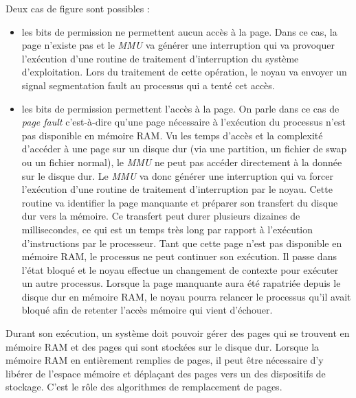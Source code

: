 \begin{itemize}
        Deux cas de figure sont possibles :
        \begin{itemize}
            \item les bits de permission ne permettent aucun accès à la
                page. Dans ce cas, la page n'existe pas et le
                \textit{MMU} va générer une interruption qui va
                provoquer l'exécution d'une routine de   traitement
                d'interruption du système d'exploitation. Lors du
                traitement de cette opération, le noyau va envoyer un
                signal   segmentation fault au processus qui a tenté cet
                accès.
            \item les bits de permission permettent l'accès à la page.
                On parle dans ce cas de \textit{page fault} c'est-à-dire
                qu'une page nécessaire à l'exécution du processus n'est
                pas disponible en mémoire RAM. Vu les temps d'accès et
                la complexité d'accéder à une page sur un disque dur
                (via une partition, un fichier de swap ou un fichier
                normal), le \textit{MMU} ne peut pas accéder directement
                à la donnée sur le disque dur. Le \textit{MMU} va donc
                générer une interruption qui va forcer l'exécution d'une
                routine de traitement d'interruption par le noyau. Cette
                routine va identifier la page manquante et préparer son
                transfert du disque dur vers la mémoire. Ce transfert
                peut durer plusieurs dizaines de millisecondes, ce qui
                est un temps très long par rapport à l'exécution
                d'instructions par le processeur. Tant que cette page
                n'est pas disponible en mémoire RAM, le processus ne
                peut continuer son exécution. Il passe dans l'état
                bloqué et le noyau effectue un changement de contexte
                pour exécuter un autre processus. Lorsque la page
                manquante aura été rapatriée depuis le disque dur en
                mémoire RAM, le noyau pourra relancer le processus qu'il
                avait bloqué afin de retenter l'accès mémoire qui vient
                d'échouer.
        \end{itemize}
\end{itemize}
   
Durant son exécution, un système doit pouvoir gérer des pages qui se
trouvent en mémoire RAM et des pages qui sont stockées sur le disque
dur. Lorsque la mémoire RAM en entièrement remplies de pages, il peut
être nécessaire d'y libérer de l'espace mémoire et déplaçant des
pages vers un des dispositifs de stockage. C'est le rôle des
algorithmes de remplacement de pages.
   
